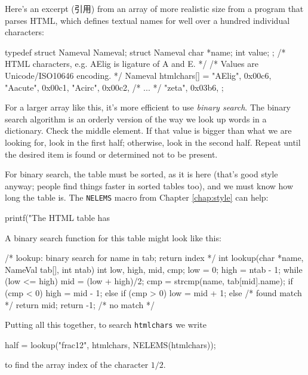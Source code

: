 Here's an excerpt (引用) from an array of more realistic size from a
program that parses HTML, which defines textual names for well over a
hundred individual characters:
\begin{wellcode}
    typedef struct Nameval Nameval;
    struct Nameval{
        char *name;
        int value;
    };
    /* HTML characters, e.g. AElig is ligature of A and E. */
    /* Values are Unicode/ISO10646 encoding. */
    Nameval htmlchars[] = {
        "AElig",    0x00c6,
        "Aacute",   0x00c1,
        "Acirc",    0x00c2,
        /* ... */
        "zeta",     0x03b6,
    };
\end{wellcode}

For a larger array like this, it's more efficient to use \textit{binary
search}. The binary search algorithm is an orderly version of the way we
look up words in a dictionary. Check the middle element. If that value is
bigger than what we are looking for, look in the first half; otherwise,
look in the second half. Repeat until the desired item is found or
determined not to be present.

For binary search, the table must be sorted, as it is here (that's good
style anyway; people find things faster in sorted tables too), and we must
know how long the table is. The \verb'NELEMS' macro from Chapter
\ref{chap:style} can help:
\begin{wellcode}
    printf("The HTML table has %
\end{wellcode}

A binary search function for this table might look like this:
\begin{wellcode}
    /* lookup: binary search for name in tab; return index */
    int lookup(char *name, NameVal tab[], int ntab)
    {
        int low, high, mid, cmp;
        low = 0;
        high = ntab - 1;
        while (low <= high){
            mid = (low + high)/2;
            cmp = strcmp(name, tab[mid].name);
            if (cmp < 0){
                high = mid - 1;
            }
            else if (cmp > 0){
                low = mid + 1;
            }
            else{   /* found match */
                return mid;
            }
        }
        return -1;  /* no match */
    }
\end{wellcode}
Putting all this together, to search \verb'htmlchars' we write
\begin{wellcode}
    half = lookup("frac12", htmlchars, NELEMS(htmlchars));
\end{wellcode}
to find the array index of the character $1/2$.

